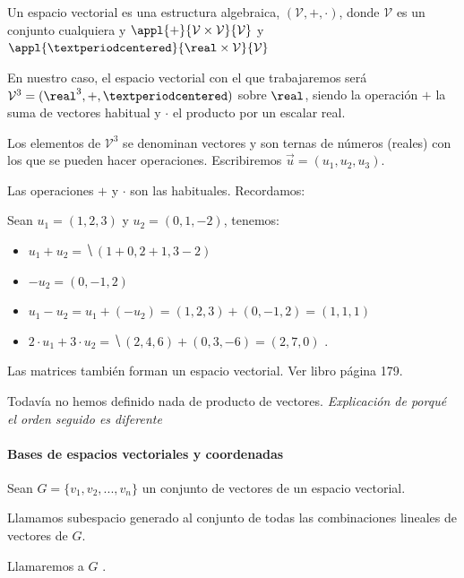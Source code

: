 
\begin{defn}
Un espacio vectorial es una estructura algebraica, $(\mathcal{V},+,·)$, donde $\mathcal{V}$ es un conjunto cualquiera y $\appl{+}{\mathcal{V}\times \mathcal{V}}{\mathcal{V}}$ y $\appl{·}{\real\times \mathcal{V}}{\mathcal{V}}$
\end{defn}

En nuestro caso, el espacio vectorial con el que trabajaremos será $\mathcal{V}^3 = (\real^3, + , ·)$ sobre $\real$, siendo la operación $+$ la suma de vectores habitual y $·$ el producto por un escalar real.

Los elementos de $\mathcal{V}^3$ se denominan vectores y son ternas de números (reales) con los que se pueden hacer operaciones. 
%
Escribiremos $\vec{u} = (u_1,u_2,u_3)$.

Las operaciones $+$ y $·$ son las habituales. 
%
Recordamos:

\begin{example}
Sean $u_1 = (1,2,3)$ y $u_2 = (0,1,-2)$, tenemos:
  \begin{itemize}
      \item $u_1 + u_2 = \hide{(1+0, 2+1, 3-2)}$
      \item $-u_2 = (0,-1,2)$
      \item $u_1-u_2 = u_1+ (-u_2) = (1,2,3) + (0,-1,2) = (1,1,1)$
      \item $2·u_1 + 3·u_2 = \hide{(2,4,6) + (0,3,-6) = (2,7,0)}$
      \obs {}.
  \end{itemize}
\end{example}

\obs Las matrices también forman un espacio vectorial. Ver libro página 179.

\obs Todavía no hemos definido nada de producto de vectores. \textit{Explicación de porqué el orden seguido es diferente}

\paragraph{Bases de espacios vectoriales y coordenadas}

\begin{defn} 
Sean $ G = \{v_1,v_2,...,v_n\}$ un conjunto de vectores de un espacio vectorial.

Llamamos subespacio generado al conjunto de todas las combinaciones lineales de vectores de $G$.

\obs Llamaremos a $G$ .
\end{defn}

